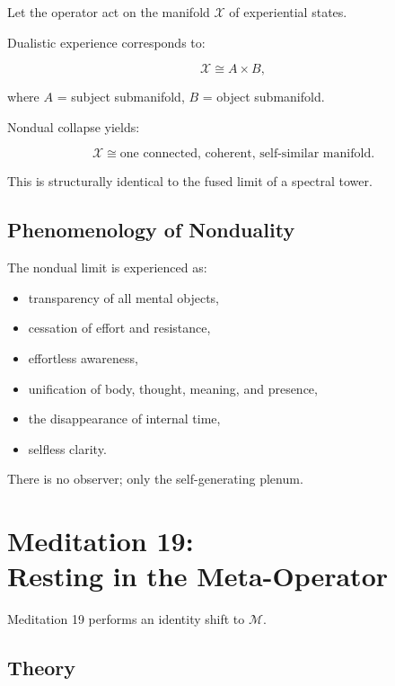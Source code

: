 \documentclass[12pt]{article}
\begin{document}
Let the operator act on the manifold $\mathcal{X}$ of experiential states.

Dualistic experience corresponds to:

\[
\mathcal{X} \cong A \times B,
\]

where $A$ = subject submanifold, $B$ = object submanifold.

Nondual collapse yields:

\[
\mathcal{X} \cong \text{one connected, coherent, self-similar manifold}.
\]

This is structurally identical to the fused limit of a spectral tower.

\section{Phenomenology of Nonduality}

The nondual limit is experienced as:

\begin{itemize}
    \item transparency of all mental objects,
    \item cessation of effort and resistance,
    \item effortless awareness,
    \item unification of body, thought, meaning, and presence,
    \item the disappearance of internal time,
    \item selfless clarity.
\end{itemize}

There is no observer; only the self-generating plenum.

\newpage


\chapter{Meditation 19:\\ Resting in the Meta-Operator}

Meditation 19 performs an identity shift to $\mathcal{M}$.

\section{Theory}
\end{document}
